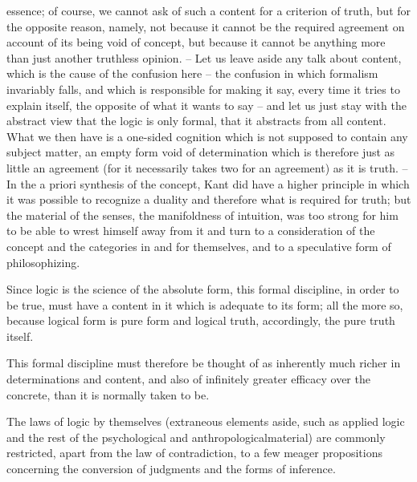 essence; of course, we cannot ask of such a content for a criterion of truth,
but for the opposite reason, namely, not because it cannot be the required
agreement on account of its being void of concept, but because it cannot
be anything more than just another truthless opinion. – Let us leave aside
any talk about content, which is the cause of the confusion here – the
confusion in which formalism invariably falls, and which is responsible for
making it say, every time it tries to explain itself, the opposite of what it
wants to say – and let us just stay with the abstract view that the logic
is only formal, that it abstracts from all content. What we then have is a
one-sided cognition which is not supposed to contain any subject matter,
an empty form void of determination which is therefore just as little an
agreement (for it necessarily takes two for an agreement) as it is truth. –
In the a priori synthesis of the concept, Kant did have a higher principle in
which it was possible to recognize a duality and therefore what is required
for truth; but the material of the senses, the manifoldness of intuition, was
too strong for him to be able to wrest himself away from it and turn to a
consideration of the concept and the categories in and for themselves, and
to a speculative form of philosophizing.

Since logic is the science of the absolute form, this formal discipline,
in order to be true, must have a content in it which is adequate to its form;
all the more so, because logical form is pure form and
logical truth, accordingly, the pure truth itself.

This formal discipline must therefore be thought of as
inherently much richer in determinations and content,
and also of infinitely greater efficacy over the concrete,
than it is normally taken to be.

The laws of logic by themselves
(extraneous elements aside, such as applied logic and
the rest of the psychological and anthropologicalmaterial)
are commonly restricted, apart from the law of contradiction,
to a few meager propositions concerning the conversion of judgments
and the forms of inference.

